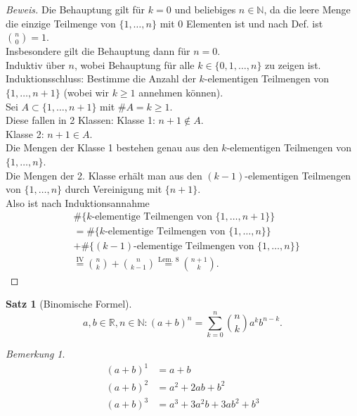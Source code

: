 \documentclass[12pt,a4paper,titlepage]{article} %
\theoremstyle{definition}
\newtheorem{satz}{Satz}[subsection]
\theoremstyle{remark}
\newtheorem*{bem}{Bemerkung}
\newenvironment{bew}{\begin{proof}[Beweis]}{\end{proof}}
\newcommand{\N}{\mathbb{N}}
\newcommand{\R}{\mathbb{R}}
\begin{document}
\begin{bew}
	Die Behauptung gilt für \(k=0\) und beliebiges \(n\in\N\), da die leere Menge die einzige Teilmenge von \( \{1,\ldots,n\} \) mit 0 Elementen ist und nach Def. ist \( \binom{n}{0} = 1 \).\\
	Insbesondere gilt die Behauptung dann für \(n=0\).\\
	Induktiv über \(n\), wobei Behauptung für alle \(k\in\{0,1,\ldots,n\}\) zu zeigen ist.\\
	Induktionsschluss: Bestimme die Anzahl der \(k\)-elementigen Teilmengen von \(\{ 1,\ldots,n+1 \}\) (wobei wir \(k\geq 1\) annehmen können).\\
	Sei \(A\subset \{1,\ldots,n+1\}\) mit \(\#A = k\geq 1\). \\
	Diese fallen in 2 Klassen:
	Klasse 1: \(n+1 \notin A\).\\
	Klasse 2: \(n+1 \in A\).\\
	Die Mengen der Klasse 1 bestehen genau aus den \(k\)-elementigen Teilmengen von \(\{1,\ldots,n\}\).\\
	Die Mengen der 2. Klasse erhält man aus den \((k-1)\)-elementigen Teilmengen von \(\{1,\ldots,n\}\) durch Vereinigung mit \(\{n+1\}\).\\
	Also ist nach Induktionsannahme
	\begin{align*}
		&\#\{k\text{-elementige Teilmengen von } \{1,\ldots,n+1\} \}\\
		&=\#\{k\text{-elementige Teilmengen von } \{1,\ldots,n\} \} \\&+ \#\{(k-1)\text{-elementige Teilmengen von } \{1,\ldots,n\} \} \\
		&\overset{\text{IV}}{=} \binom{n}{k} + \binom{n}{k-1} \overset{\text{Lem. 8}}{=} \binom{n+1}{k}.
	\end{align*}
\end{bew}
\begin{satz}[Binomische Formel]
	\[ a,b\in\R,n\in\N:(a+b)^n = \sum_{k=0}^{n} \binom{n}{k} a^k b^{n-k}. \]
\end{satz}
\begin{bem}
	\begin{align}
		(a+b)^1 &= a+b\\
		(a+b)^2 &= a^2 + 2ab + b^2\\
		(a+b)^3 &= a^3 +3a^2b + 3ab^2 +b^3
	\end{align}
\end{bem}
\end{document}
